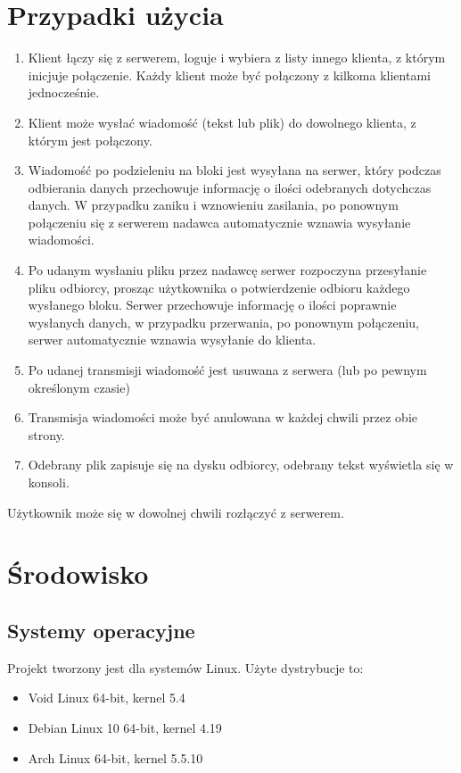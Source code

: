 \documentclass{article}
\begin{document}
\section{Przypadki użycia\label{przyp}}

\begin{enumerate}
\item Klient łączy się z serwerem, loguje i wybiera z listy innego klienta, z którym inicjuje połączenie.
Każdy klient może być połączony z kilkoma klientami jednocześnie.
\item Klient może wysłać wiadomość (tekst lub plik) do dowolnego klienta, z którym jest połączony.
\item Wiadomość po podzieleniu na bloki jest wysyłana na serwer, który podczas odbierania danych przechowuje informację o ilości odebranych dotychczas danych. W przypadku zaniku i wznowieniu zasilania, po ponownym połączeniu się z serwerem nadawca automatycznie wznawia wysyłanie wiadomości.
\item Po udanym wysłaniu pliku przez nadawcę serwer rozpoczyna przesyłanie pliku odbiorcy, prosząc użytkownika o potwierdzenie odbioru każdego wysłanego bloku. Serwer przechowuje informację o ilości poprawnie wysłanych danych, w przypadku przerwania, po ponownym połączeniu, serwer automatycznie wznawia wysyłanie do klienta.
\item Po udanej transmisji wiadomość jest usuwana z serwera (lub po pewnym określonym czasie)
\item Transmisja wiadomości może być anulowana w każdej chwili przez obie strony. 
\item Odebrany plik zapisuje się na dysku odbiorcy, odebrany tekst wyświetla się w konsoli.
\end{enumerate}

Użytkownik może się w dowolnej chwili rozłączyć z serwerem.

\section{Środowisko\label{srod}}

\subsection{Systemy operacyjne}

Projekt tworzony jest dla systemów Linux. Użyte dystrybucje to:
\begin{itemize}

\item Void Linux 64-bit, kernel 5.4
\item Debian Linux 10 64-bit, kernel 4.19
\item Arch Linux 64-bit, kernel 5.5.10

\end{itemize}
\end{document}
